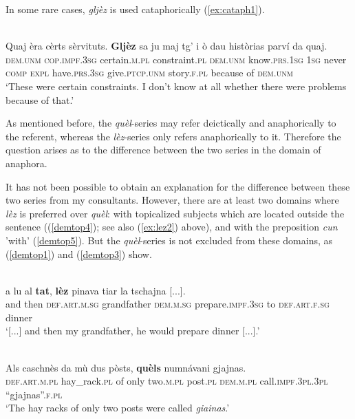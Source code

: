 In some rare cases, \textit{gljèz} is used cataphorically (\ref{ex:cataph1}).

\ea\label{ex:cataph1}
\\
\gll  Quaj èra cèrts sèrvituts. \textbf{Gljèz} sa ju maj tg’ i ò dau històrias parví da quaj. \\
    \textsc{dem.unm} \textsc{cop.impf.3sg} certain.\textsc{m.pl} constraint.\textsc{pl} \textsc{dem.unm}  know.\textsc{prs.1sg} \textsc{1sg} never \textsc{comp} \textsc{expl} have.\textsc{prs.3sg} give.\textsc{ptcp.unm} story.\textsc{f.pl} because of \textsc{dem.unm} \\
\glt `These were certain constraints. I don’t know at all whether there were problems because of that.'
\z

As mentioned before, the \textit{quèl}-series may refer deictically and anaphorically to the referent, whereas the \textit{lèz}-series only refers anaphorically to it. Therefore the question arises as to the difference between the two series in the domain of anaphora.

It has not been possible to obtain an explanation for the difference between these two series from my consultants. However, there are at least two domains where \textit{lèz} is preferred over \textit{quèl}: with topicalized subjects which are located outside the sentence ((\ref{demtop4}); see also (\ref{ex:lez2}) above), and with the preposition \textit{cun} 'with' (\ref{demtop5}). But the \textit{quèl}-series is not excluded from these domains, as (\ref{demtop1}) and (\ref{demtop3}) show.

\ea
\label{demtop4}
\\
\gll [...] a lu al \textbf{tat}, \textbf{lèz} pinava tiar la tschajna [...].  \\
  {} and then \textsc{def.art.m.sg} grandfather \textsc{dem.m.sg} prepare.\textsc{impf.3sg} to \textsc{def.art.f.sg} dinner  \\
\glt `[...] and then my grandfather, he would prepare dinner [...].'
\z

\ea\label{demtop1}
\\
\gll   Als caschnès da mù dus pòsts, \textbf{quèls} numnávani gjajnas.\\
     \textsc{def.art.m.pl} hay\_rack.\textsc{pl} of only two.\textsc{m.pl} post.\textsc{pl} \textsc{dem.m.pl} call.\textsc{impf.3pl.3pl} “gjajnas”.\textsc{f.pl}\\
\glt `The hay racks of only two posts were called \textit{giainas}.'
\z

